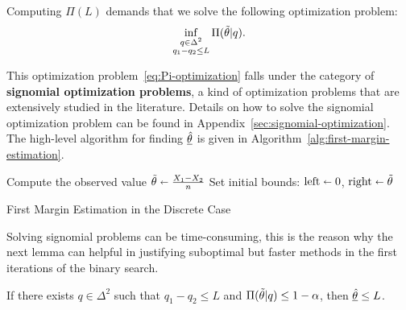 Computing $\Pi(L)$ demands that we solve the following optimization problem:
\begin{equation}
    \inf_{\substack{q\in\Delta^{2}\\q_1-q_2\leq L}}\Pi(\Tilde{\theta}|q).\label{eq:Pi-optimization}
\end{equation}

This optimization problem~\eqref{eq:Pi-optimization} falls under the category of \textbf{signomial optimization problems}, a kind of optimization problems that are extensively studied in the literature.
Details on how to solve the signomial optimization problem can be found in Appendix~\ref{sec:signomial-optimization}.
The high-level algorithm for finding $\underline{\Hat{\theta}}$ is given in Algorithm~\ref{alg:first-margin-estimation}.
\begin{algorithm}[h]
    \DontPrintSemicolon %
    Compute the observed value $\Tilde{\theta}\shortleftarrow\frac{X_1-X_2}{n}$\;
    Set initial bounds: $\text{left}\shortleftarrow0$, $\text{right}\shortleftarrow\Tilde{\theta}$ \;
    \caption{First Margin Estimation in the Discrete Case}\label{alg:first-margin-estimation}
\end{algorithm}

Solving signomial problems can be time-consuming, this is the reason why the next lemma can helpful in justifying suboptimal but faster methods in the first iterations of the binary search.
\begin{lemma}
    \label{lemma:suboptimal}
    If there exists $q\in\Delta^{2}$ such that $q_1-q_2\leq L$ and $\Pi(\Tilde{\theta}|q)\leq 1-\alpha$, then $\underline{\Hat{\theta}} \leq L$.
\end{lemma}

